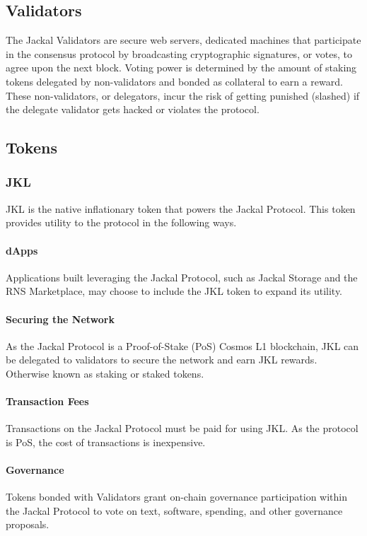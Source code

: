 \documentclass[a4paper]{article}
\begin{document}
\clearpage
\newpage
\subsection{Validators}
The Jackal Validators are secure web servers, dedicated machines that participate in the consensus protocol by broadcasting cryptographic signatures, or votes, to agree upon the next block. Voting power is determined by the amount of staking tokens delegated by non-validators and bonded as collateral to earn a reward. These non-validators, or delegators, incur the risk of getting punished (slashed) if the delegate validator gets hacked or violates the protocol.

\subsection{Tokens}
\subsubsection{JKL}
JKL is the native inflationary token that powers the Jackal Protocol. This token provides utility to the protocol in the following ways. 

\paragraph{dApps}
Applications built leveraging the Jackal Protocol, such as Jackal Storage and the RNS Marketplace, may choose to include the JKL token to expand its utility. 

\paragraph{Securing the Network}
As the Jackal Protocol is a Proof-of-Stake (PoS) Cosmos L1 blockchain, JKL can be delegated to validators to secure the network and earn JKL rewards. Otherwise known as staking or staked tokens.

\paragraph{Transaction Fees}
Transactions on the Jackal Protocol must be paid for using JKL. As the protocol is PoS, the cost of transactions is inexpensive. 

\paragraph{Governance}
Tokens bonded with Validators grant on-chain governance participation within the Jackal Protocol to vote on text, software, spending, and other governance proposals. 
\end{document}
